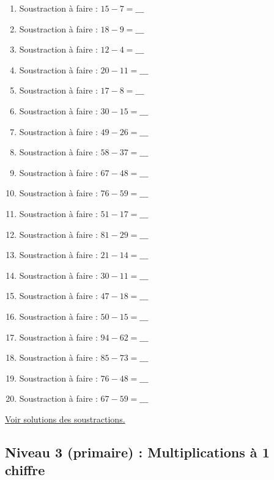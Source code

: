 \documentclass[11pt]{article}
\begin{document}
\begin{enumerate}
\item Soustraction à faire :  \(15 - 7 = \_\_\_\)
\item Soustraction à faire :  \(18 - 9 = \_\_\_\)
\item Soustraction à faire :  \(12 - 4 = \_\_\_\)
\item Soustraction à faire :  \(20 - 11 = \_\_\_\)
\item Soustraction à faire :  \(17 - 8 = \_\_\_\)
\item Soustraction à faire :  \(30 - 15 = \_\_\_\)
\item Soustraction à faire :  \(49 - 26 = \_\_\_\)
\item Soustraction à faire :  \(58 - 37 = \_\_\_\)
\item Soustraction à faire :  \(67 - 48 = \_\_\_\)
\item Soustraction à faire :  \(76 - 59 = \_\_\_\)
\item Soustraction à faire :  \(51 - 17 = \_\_\_\)
\item Soustraction à faire :  \(81 - 29 = \_\_\_\)
\item Soustraction à faire :  \(21 - 14 = \_\_\_\)
\item Soustraction à faire :  \(30 - 11 = \_\_\_\)
\item Soustraction à faire :  \(47 - 18 = \_\_\_\)
\item Soustraction à faire :  \(50 - 15 = \_\_\_\)
\item Soustraction à faire :  \(94 - 62 = \_\_\_\)
\item Soustraction à faire :  \(85 - 73 = \_\_\_\)
\item Soustraction à faire :  \(76 - 48 = \_\_\_\)
\item Soustraction à faire :  \(67 - 59 = \_\_\_\)
\end{enumerate}




\hyperref[orgaa3e8ef]{Voir solutions des soustractions.}




\newpage

\subsection{Niveau 3 (primaire) : Multiplications à 1 chiffre}
\label{sec:orga46a269}
\label{orgbc31eca}
\end{document}
